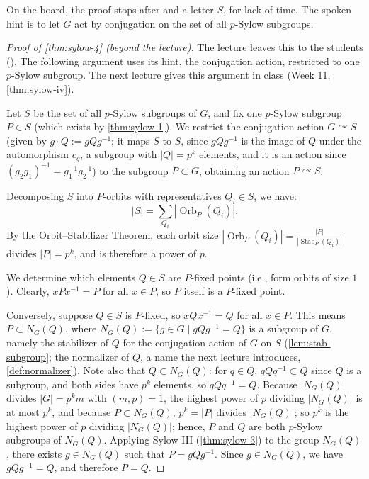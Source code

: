 \begin{content}
On the board, the proof stops after  and a letter $S$, for lack of time. The spoken hint is to let $G$ act by conjugation on the set of all $p$-Sylow subgroups.


\begin{proof}[Proof of \cref{thm:sylow-4} (beyond the lecture)]
The lecture leaves this to the students (). The following argument uses its hint, the conjugation action, restricted to one $p$-Sylow subgroup. The next lecture gives this argument in class (Week 11, \cref{thm:sylow-iv}).

Let $S$ be the set of all $p$-Sylow subgroups of $G$, and fix one $p$-Sylow subgroup $P \in S$ (which exists by \cref{thm:sylow-1}). We restrict the conjugation action $G \curvearrowright S$ (given by $g \cdot Q := g Q g^{-1}$; it maps $S$ to $S$, since $g Q g^{-1}$ is the image of $Q$ under the automorphism $c_g$, a subgroup with $|Q| = p^k$ elements, and it is an action since $(g_2 g_1)^{-1} = g_1^{-1} g_2^{-1}$) to the subgroup $P \subset G$, obtaining an action $P \curvearrowright S$.

Decomposing $S$ into $P$-orbits with representatives $Q_i \in S$, we have:
\[
|S| = \sum_{Q_i} |\operatorname{Orb}_P(Q_i)|.
\]
By the Orbit--Stabilizer Theorem, each orbit size $|\operatorname{Orb}_P(Q_i)| = \frac{|P|}{|\operatorname{Stab}_P(Q_i)|}$ divides $|P| = p^k$, and is therefore a power of $p$.

We determine which elements $Q \in S$ are $P$-fixed points (i.e., form orbits of size $1$). Clearly, $x P x^{-1} = P$ for all $x \in P$, so $P$ itself is a $P$-fixed point.

Conversely, suppose $Q \in S$ is $P$-fixed, so $x Q x^{-1} = Q$ for all $x \in P$. This means $P \subset N_G(Q)$, where $N_G(Q) := \{ g \in G \mid g Q g^{-1} = Q \}$ is a subgroup of $G$, namely the stabilizer of $Q$ for the conjugation action of $G$ on $S$ (\cref{lem:stab-subgroup}; the normalizer of $Q$, a name the next lecture introduces, \cref{def:normalizer}). Note also that $Q \subset N_G(Q)$: for $q \in Q$, $q Q q^{-1} \subset Q$ since $Q$ is a subgroup, and both sides have $p^k$ elements, so $q Q q^{-1} = Q$. Because $|N_G(Q)|$ divides $|G| = p^k m$ with $(m, p) = 1$, the highest power of $p$ dividing $|N_G(Q)|$ is at most $p^k$, and because $P \subset N_G(Q)$, $p^k = |P|$ divides $|N_G(Q)|$; so $p^k$ is the highest power of $p$ dividing $|N_G(Q)|$; hence, $P$ and $Q$ are both $p$-Sylow subgroups of $N_G(Q)$. Applying Sylow III (\cref{thm:sylow-3}) to the group $N_G(Q)$, there exists $g \in N_G(Q)$ such that $P = g Q g^{-1}$. Since $g \in N_G(Q)$, we have $g Q g^{-1} = Q$, and therefore $P = Q$.


\end{proof}
\end{content}
